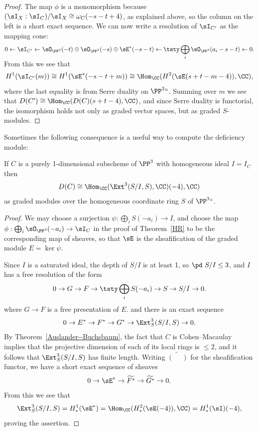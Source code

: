 \begin{proof}
The map $\phi$ is a monomorphism because $(\sI_X:\sI_C)/\sI_X \cong
\omega_C(-s-t+4)$, as explained above, so the column on the left is a
short exact sequence.
We can now write a resolution of $\sI_{C'}$ as the mapping cone:
$$
0\leftarrow \sI_{C'} \leftarrow \sO_{\PP^3}(-t)\oplus \sO_{\PP^3}(-s)
\oplus \sE^*(-s-t) \leftarrow
\smash[b]{\tsty\bigoplus\limits_i\sO_{\PP^3}(a_i-s-t)}\leftarrow 0.
$$
From this we see that
$$
H^1(\sI_{C'}(m)) \cong H^1(\sE^*(-s-t+m)) \cong \Hom_\CC(
H^2(\sE(s+t-m-4)), \CC)
,
$$
where the last equality is from
Serre duality
on $\PP^3` `$. Summing
%
over $m$ we see that
$D(C') \cong \Hom_\CC(D(C)(s+t-4), \CC)$,
and since Serre duality is functorial, the isomorphism holds not only
as graded vector spaces, but as graded $S$-modules.
\end{proof}

Sometimes the following consequence is a useful way to compute the
deficiency module:

\begin{proposition}\label{deficiency as dual of Ext}
If $C$ is a purely 1-dimensional subscheme of $\PP^3$ with homogeneous
ideal $I = I_C$ then
$$
D(C) \cong \Hom_\CC (\Ext^3(S/I, S), \CC)(-4), \CC)
$$
as graded modules over the homogeneous coordinate ring $S$ of $\PP^3` `$.
\unif
\end{proposition}

\begin{proof}
We may choose a surjection $\psi: \bigoplus_iS(-a_i)\to I$, and choose
the map
$\phi: \bigoplus_i\sO_{\PP^3}(-a_i)\to\sI_C$
in the proof of Theorem~\ref{HR}
to be the corresponding map of sheaves, so that
$\sE$ is the sheafification of the graded module $E = \ker \psi$.

Since $I$ is a saturated ideal,
the depth of $S/I$ is at least 1, so $\pd\ S/I\leq 3$, and $I$ has a
free resolution of the form
$$
0\to G \to F \to \tsty\bigoplus\limits_iS(-a_i) \to S\to S/I \to 0.
$$
where $G\to F$ is a free presentation of $E$. and there is an exact
sequence
$$
0 \to E^* \to F^* \to G^* \to \Ext^3_S(S/I, S) \to 0.
$$
By Theorem~\ref{Auslander--Buchsbaum}, the fact that $C$ is Cohen--Macaulay
implies that the projective dimension of each of its
local rings is $\leq 2$, and it follows that
$\Ext^3_S(S/I, S)$ has finite length. Writing $\widetilde{(\phantom{-})}$
for the sheafification functor,
we have a short exact sequence of sheaves
$$
0\to \sE^* \to \widetilde{F^*} \to \widetilde{G^*}\to 0.
$$
From this we see that
$$
\Ext^3_S(S/I,S) = H^1_*(\sE^*) = \Hom_\CC( H^2_*(\sE(-4)),\CC) =
H^1_*(\sI)(-4),
$$
proving the assertion.
\end{proof}

